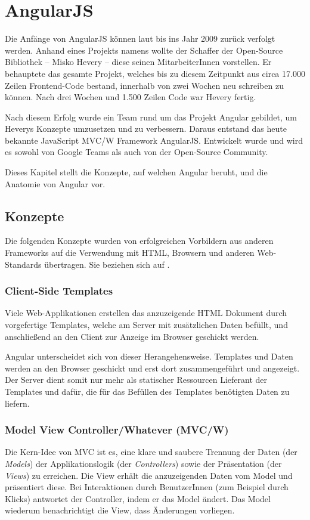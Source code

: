 \newpage
\section{AngularJS}
\label{AngularJS}
Die Anfänge von AngularJS können laut \cite{Green:2013} bis ins Jahr 2009 zurück verfolgt werden. Anhand eines Projekts namens  wollte der Schaffer der Open-Source Bibliothek -- Misko Hevery -- diese seinen MitarbeiterInnen vorstellen. Er behauptete das gesamte Projekt, welches bis zu diesem Zeitpunkt aus circa 17.000 Zeilen Frontend-Code bestand, innerhalb von zwei Wochen neu schreiben zu können. Nach drei Wochen und 1.500 Zeilen Code war Hevery fertig.

Nach diesem Erfolg wurde ein Team rund um das Projekt Angular gebildet, um Heverys Konzepte umzusetzen und zu verbessern. Daraus entstand das heute bekannte JavaScript MVC/W Framework AngularJS. Entwickelt wurde und wird es sowohl von Google Teams als auch von der Open-Source Community.

Dieses Kapitel stellt die Konzepte, auf welchen Angular beruht, und die Anatomie von Angular vor.

\subsection{Konzepte}
Die folgenden Konzepte wurden von erfolgreichen Vorbildern aus anderen Frameworks auf die Verwendung mit HTML, Browsern und anderen Web-Standards übertragen. Sie beziehen sich auf \cite[2-6]{Green:2013}.

\subsubsection{Client-Side Templates}
Viele Web-Applikationen erstellen das anzuzeigende HTML Dokument durch vorgefertige Templates, welche am Server mit zusätzlichen Daten befüllt, und anschließend an den Client zur Anzeige im Browser geschickt werden.

Angular unterscheidet sich von dieser Herangehensweise. Templates und Daten werden an den Browser geschickt und erst dort zusammengeführt und angezeigt. Der Server dient somit nur mehr als statischer Ressourcen Lieferant der Templates und dafür, die für das Befüllen des Templates benötigten Daten zu liefern.

\subsubsection{Model View Controller/Whatever (MVC/W)}
Die Kern-Idee von MVC ist es, eine klare und saubere Trennung der Daten (der \textit{Models}) der Applikationslogik (der \textit{Controllers}) sowie der Präsentation (der \textit{Views}) zu erreichen. Die View erhält die anzuzeigenden Daten vom Model und präsentiert diese. Bei Interaktionen durch BenutzerInnen (zum Beispiel durch Klicks) antwortet der Controller, indem er das Model ändert. Das Model wiederum benachrichtigt die View, dass Änderungen vorliegen.


